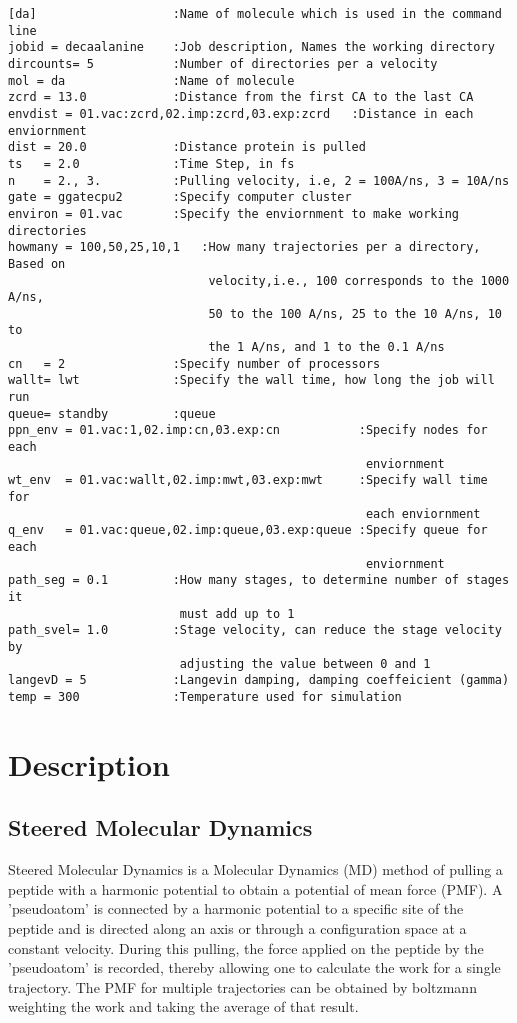 \documentclass[11pt]{article}
\begin{document}
\begin{verbatim}
[da]                   :Name of molecule which is used in the command line
jobid = decaalanine    :Job description, Names the working directory
dircounts= 5           :Number of directories per a velocity
mol = da               :Name of molecule
zcrd = 13.0            :Distance from the first CA to the last CA
envdist = 01.vac:zcrd,02.imp:zcrd,03.exp:zcrd   :Distance in each enviornment
dist = 20.0            :Distance protein is pulled
ts   = 2.0             :Time Step, in fs
n    = 2., 3.          :Pulling velocity, i.e, 2 = 100A/ns, 3 = 10A/ns
gate = ggatecpu2       :Specify computer cluster
environ = 01.vac       :Specify the enviornment to make working directories
howmany = 100,50,25,10,1   :How many trajectories per a directory, Based on 
                            velocity,i.e., 100 corresponds to the 1000 A/ns, 
                            50 to the 100 A/ns, 25 to the 10 A/ns, 10 to 
                            the 1 A/ns, and 1 to the 0.1 A/ns  
cn   = 2               :Specify number of processors
wallt= lwt             :Specify the wall time, how long the job will run
queue= standby         :queue
ppn_env = 01.vac:1,02.imp:cn,03.exp:cn           :Specify nodes for each 
                                                  enviornment
wt_env  = 01.vac:wallt,02.imp:mwt,03.exp:mwt     :Specify wall time for 
                                                  each enviornment
q_env   = 01.vac:queue,02.imp:queue,03.exp:queue :Specify queue for each 
                                                  enviornment
path_seg = 0.1         :How many stages, to determine number of stages it
                        must add up to 1   
path_svel= 1.0         :Stage velocity, can reduce the stage velocity by 
                        adjusting the value between 0 and 1
langevD = 5            :Langevin damping, damping coeffeicient (gamma)
temp = 300             :Temperature used for simulation
\end{verbatim}



\section{Description}
\subsection{Steered Molecular Dynamics}
Steered Molecular Dynamics is a Molecular Dynamics (MD) method of pulling a peptide with a harmonic potential to obtain a potential of mean force (PMF). A 'pseudoatom' is connected by a harmonic potential to a specific site of the peptide and is directed along an axis or through a configuration space at a constant velocity. During this pulling, the force applied on the peptide by the 'pseudoatom' is recorded, thereby allowing one to calculate the work for a single trajectory. The PMF for multiple trajectories can be obtained by boltzmann weighting the work and taking the average of that result. 
\end{document}
